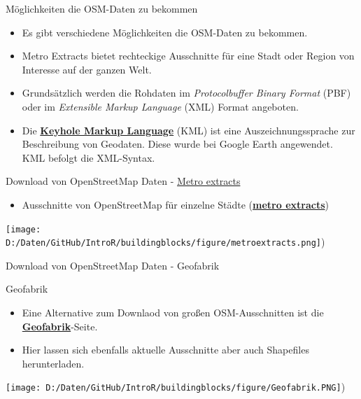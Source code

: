 \documentclass[ignorenonframetext,]{beamer}
\providecommand{\tightlist}{%
  \setlength{\itemsep}{0pt}\setlength{\parskip}{0pt}}
\begin{document}
\begin{frame}{Möglichkeiten die OSM-Daten zu bekommen}

\begin{itemize}
\tightlist
\item
  Es gibt verschiedene Möglichkeiten die OSM-Daten zu bekommen.
\item
  Metro Extracts bietet rechteckige Ausschnitte für eine Stadt oder
  Region von Interesse auf der ganzen Welt.
\item
  Grundsätzlich werden die Rohdaten im \emph{Protocolbuffer Binary
  Format} (PBF) oder im \emph{Extensible Markup Language} (XML) Format
  angeboten.
\item
  Die
  \href{https://de.wikipedia.org/wiki/Keyhole_Markup_Language}{\textbf{Keyhole
  Markup Language}} (KML) ist eine Auszeichnungssprache zur Beschreibung
  von Geodaten. Diese wurde bei Google Earth angewendet. KML befolgt die
  XML-Syntax.
\end{itemize}

\end{frame}

\begin{frame}{Download von OpenStreetMap Daten -
\href{https://mapzen.com/}{Metro extracts}}

\begin{itemize}
\tightlist
\item
  Ausschnitte von OpenStreetMap für einzelne Städte
  (\href{https://mapzen.com/data/metro-extracts/}{\textbf{metro
  extracts}})
\end{itemize}

\texttt{[image: D:/Daten/GitHub/IntroR/buildingblocks/figure/metroextracts.png]})

\end{frame}

\begin{frame}{Download von OpenStreetMap Daten - Geofabrik}

\begin{block}{Geofabrik}

\begin{itemize}
\tightlist
\item
  Eine Alternative zum Downlaod von großen OSM-Ausschnitten ist die
  \href{http://download.geofabrik.de/}{\textbf{Geofabrik}}-Seite.\\
\item
  Hier lassen sich ebenfalls aktuelle Ausschnitte aber auch Shapefiles
  herunterladen.
\end{itemize}

\texttt{[image: D:/Daten/GitHub/IntroR/buildingblocks/figure/Geofabrik.PNG]})

\end{block}

\end{frame}
\end{document}
